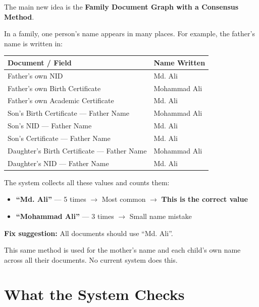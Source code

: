 \documentclass[12pt, a4paper]{article}
\begin{document}
The main new idea is the \textbf{Family Document Graph with a Consensus Method}.

In a family, one person's name appears in many places. For example, the
father's name is written in:

\begin{center}
\begin{tabular}{|p{6cm}|p{5cm}|}
    \hline
    \textbf{Document / Field} & \textbf{Name Written} \\
    \hline
    Father's own NID & Md. Ali \\
    \hline
    Father's own Birth Certificate & Mohammad Ali \\
    \hline
    Father's own Academic Certificate & Md. Ali \\
    \hline
    Son's Birth Certificate --- Father Name & Mohammad Ali \\
    \hline
    Son's NID --- Father Name & Md. Ali \\
    \hline
    Son's Certificate --- Father Name & Md. Ali \\
    \hline
    Daughter's Birth Certificate --- Father Name & Mohammad Ali \\
    \hline
    Daughter's NID --- Father Name & Md. Ali \\
    \hline
\end{tabular}
\end{center}

\vspace{0.3cm}
The system collects all these values and counts them:

\begin{itemize}
    \item \textbf{``Md. Ali''} --- 5 times $\rightarrow$ Most common
          $\rightarrow$ \textbf{This is the correct value}
    \item \textbf{``Mohammad Ali''} --- 3 times $\rightarrow$ Small name mistake
\end{itemize}

\textbf{Fix suggestion:} All documents should use ``Md. Ali''.

\vspace{0.4cm}
This same method is used for the mother's name and each child's own name
across all their documents. No current system does this.

\section{What the System Checks}
\end{document}
